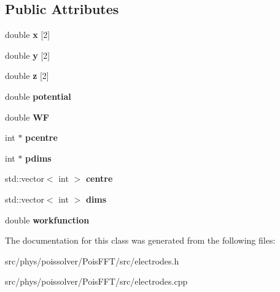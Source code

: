 \subsection*{Public Attributes}
\begin{DoxyCompactItemize}
\item 
double {\bfseries x} \mbox{[}2\mbox{]}\hypertarget{classElectrodes_aa4ba911dd884ca27c0c204a9b8762f9c}{}\label{classElectrodes_aa4ba911dd884ca27c0c204a9b8762f9c}

\item 
double {\bfseries y} \mbox{[}2\mbox{]}\hypertarget{classElectrodes_afa07431402e96f46f406101ede9fdea8}{}\label{classElectrodes_afa07431402e96f46f406101ede9fdea8}

\item 
double {\bfseries z} \mbox{[}2\mbox{]}\hypertarget{classElectrodes_ad9b73430ee55e7009a5aa146a892a628}{}\label{classElectrodes_ad9b73430ee55e7009a5aa146a892a628}

\item 
double {\bfseries potential}\hypertarget{classElectrodes_a77442f05890b0bac7c87b17316ff6ca0}{}\label{classElectrodes_a77442f05890b0bac7c87b17316ff6ca0}

\item 
double {\bfseries WF}\hypertarget{classElectrodes_a70a7d5366d52ae6593eda6fe04959981}{}\label{classElectrodes_a70a7d5366d52ae6593eda6fe04959981}

\item 
int $\ast$ {\bfseries pcentre}\hypertarget{classElectrodes_aec5e29dc278286d9bdc37b5582d3b41b}{}\label{classElectrodes_aec5e29dc278286d9bdc37b5582d3b41b}

\item 
int $\ast$ {\bfseries pdims}\hypertarget{classElectrodes_ae1b55f2d7b3536df831ee7245f89e520}{}\label{classElectrodes_ae1b55f2d7b3536df831ee7245f89e520}

\item 
std\+::vector$<$ int $>$ {\bfseries centre}\hypertarget{classElectrodes_aa27164d6d522f61c1905bbb9c21509ec}{}\label{classElectrodes_aa27164d6d522f61c1905bbb9c21509ec}

\item 
std\+::vector$<$ int $>$ {\bfseries dims}\hypertarget{classElectrodes_ac3c6601a2ec66a0428947b33d7a3dfb8}{}\label{classElectrodes_ac3c6601a2ec66a0428947b33d7a3dfb8}

\item 
double {\bfseries workfunction}\hypertarget{classElectrodes_ae81727edff9f436e852c495bb3dd8d6b}{}\label{classElectrodes_ae81727edff9f436e852c495bb3dd8d6b}

\end{DoxyCompactItemize}


The documentation for this class was generated from the following files\+:\begin{DoxyCompactItemize}
\item 
src/phys/poissolver/\+Pois\+F\+F\+T/src/electrodes.\+h\item 
src/phys/poissolver/\+Pois\+F\+F\+T/src/electrodes.\+cpp\end{DoxyCompactItemize}
